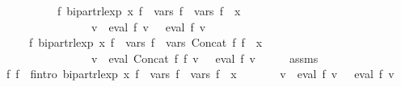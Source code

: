 \begin{isabellebody}
\ \ \ \ \ \ \ \ \ \ {\isachardoublequoteopen}{\isasymexists}f{\isacharprime}{\kern0pt}{\isachardot}{\kern0pt}\ bipart{\isacharunderscore}{\kern0pt}rlexp\ x\ f{\isacharprime}{\kern0pt}\ {\isasymand}\ vars\ f{\isacharprime}{\kern0pt}\ {\isacharequal}{\kern0pt}\ vars\ f{}\ {\isasymunion}\ {\isacharbraceleft}{\kern0pt}x{\isacharbraceright}{\kern0pt}\ {\isasymand}\isanewline
\ \ \ \ \ \ \ \ \ \ \ \ \ \ \ \ {\isacharparenleft}{\kern0pt}{\isasymforall}v{\isachardot}{\kern0pt}\ {\isasymPsi}\ {\isacharparenleft}{\kern0pt}eval\ f{}\ v{\isacharparenright}{\kern0pt}\ {\isacharequal}{\kern0pt}\ {\isasymPsi}\ {\isacharparenleft}{\kern0pt}eval\ f{\isacharprime}{\kern0pt}\ v{\isacharparenright}{\kern0pt}{\isacharparenright}{\kern0pt}{\isachardoublequoteclose}\isanewline
\ \ \ \ \ {\isachardoublequoteopen}{\isasymexists}f{\isacharprime}{\kern0pt}{\isachardot}{\kern0pt}\ bipart{\isacharunderscore}{\kern0pt}rlexp\ x\ f{\isacharprime}{\kern0pt}\ {\isasymand}\ vars\ f{\isacharprime}{\kern0pt}\ {\isacharequal}{\kern0pt}\ vars\ {\isacharparenleft}{\kern0pt}Concat\ f{}\ f{}{\isacharparenright}{\kern0pt}\ {\isasymunion}\ {\isacharbraceleft}{\kern0pt}x{\isacharbraceright}{\kern0pt}\ {\isasymand}\isanewline
\ \ \ \ \ \ \ \ \ \ \ \ \ \ \ \ {\isacharparenleft}{\kern0pt}{\isasymforall}v{\isachardot}{\kern0pt}\ {\isasymPsi}\ {\isacharparenleft}{\kern0pt}eval\ {\isacharparenleft}{\kern0pt}Concat\ f{}\ f{}{\isacharparenright}{\kern0pt}\ v{\isacharparenright}{\kern0pt}\ {\isacharequal}{\kern0pt}\ {\isasymPsi}\ {\isacharparenleft}{\kern0pt}eval\ f{\isacharprime}{\kern0pt}\ v{\isacharparenright}{\kern0pt}{\isacharparenright}{\kern0pt}{\isachardoublequoteclose}\isanewline
%
\isadelimproof
%
\endisadelimproof
%
\isatagproof
{}\isamarkupfalse%
\ {\isacharminus}{\kern0pt}\isanewline
\ \ \isamarkupfalse%
\ assms\ \isamarkupfalse%
\ f{}{\isacharprime}{\kern0pt}\ f{}{\isacharprime}{\kern0pt}\ \ f{}{\isacharprime}{\kern0pt}{\isacharunderscore}{\kern0pt}intro{\isacharcolon}{\kern0pt}\ {\isachardoublequoteopen}bipart{\isacharunderscore}{\kern0pt}rlexp\ x\ f{}{\isacharprime}{\kern0pt}\ {\isasymand}\ vars\ f{}{\isacharprime}{\kern0pt}\ {\isacharequal}{\kern0pt}\ vars\ f{}\ {\isasymunion}\ {\isacharbraceleft}{\kern0pt}x{\isacharbraceright}{\kern0pt}\ {\isasymand}\isanewline
\ \ \ \ \ \ {\isacharparenleft}{\kern0pt}{\isasymforall}v{\isachardot}{\kern0pt}\ {\isasymPsi}\ {\isacharparenleft}{\kern0pt}eval\ f{}\ v{\isacharparenright}{\kern0pt}\ {\isacharequal}{\kern0pt}\ {\isasymPsi}\ {\isacharparenleft}{\kern0pt}eval\ f{}{\isacharprime}{\kern0pt}\ v{\isacharparenright}{\kern0pt}{\isacharparenright}{\kern0pt}{\isachardoublequoteclose}\isanewline

\end{isabellebody}
